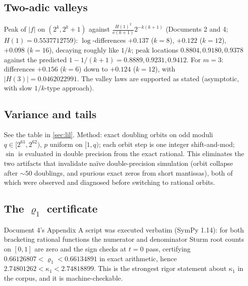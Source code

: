 \documentclass[11pt,oneside]{article}
\theoremstyle{definition}
\theoremstyle{remark}
\newcommand{\e}{\mathrm e}
\begin{document}
\subsection{Two-adic valleys}
\label{ssec:valleys}

Peak of $|f|$ on $(2^k,2^k+1)$ against
$\frac{H(1)^2}{\e(k+1)}2^{-k(k+1)}$
(Documents 2 and 4; $H(1)=0.5537712759$):
$\log$-differences $+0.137$ ($k=8$), $+0.122$ ($k=12$), $+0.098$
($k=16$), decaying roughly like $1/k$; peak locations
$0.8804,0.9180,0.9378$ against the predicted $1-1/(k+1)=
0.8889,0.9231,0.9412$.  For $m=3$: differences $+0.156$ ($k=6$) down to
$+0.124$ ($k=12$), with $|H(3)|=0.0462022991$.  The valley laws are
supported as stated (asymptotic, with slow $1/k$-type approach).

\subsection{Variance and tails}
\label{ssec:variance}

See the table in \cref{sec:lil}.  Method: exact doubling orbits on odd
moduli $q\in[2^{61},2^{62})$, $p$ uniform on $[1,q)$; each orbit step is
one integer shift-and-mod; $\sin$ is evaluated in double precision from
the exact rational.  This eliminates the two artifacts that invalidate
na\"ive double-precision simulation (orbit collapse after $\sim50$
doublings, and spurious exact zeros from short mantissas), both of which
were observed and diagnosed before switching to rational orbits.

\subsection{The $\varrho_1$ certificate}
\label{ssec:certificate}

Document 4's Appendix A script was executed verbatim (SymPy 1.14):
for both bracketing rational functions the numerator and denominator
Sturm root counts on $[0,1]$ are zero and the sign checks at $t=0$ pass,
certifying $0.66126807<\varrho_1<0.66134891$ in exact arithmetic,
hence $2.74801262<\kappa_1<2.74818899$.  This is the strongest
rigor statement about $\kappa_1$ in the corpus, and it is machine-checkable.
\end{document}
